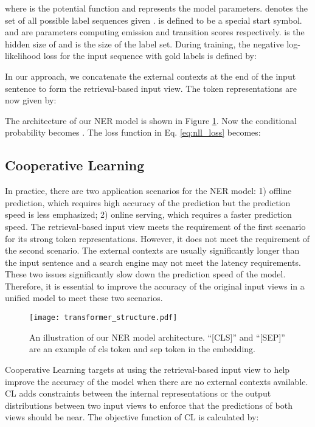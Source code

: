 \documentclass[11pt,a4paper]{article}
\begin{document}
where  is the potential function and  represents the model parameters.  denotes the set of all possible label sequences given .  is defined to be a special start symbol.  and  are parameters computing emission and transition scores respectively.  is the hidden size of  and  is the size of the label set. During training, the negative log-likelihood loss for the input sequence with gold labels  is defined by:


In our approach, we concatenate the external contexts  at the end of the input sentence  to form the retrieval-based input view. The token representations are now given by:

The architecture of our NER model is shown in Figure \ref{fig:ner}. Now the conditional probability  becomes . 
The loss function in Eq. \ref{eq:nll_loss} becomes:





\subsection{Cooperative Learning}
In practice, there are two application scenarios for the NER model: 1) offline prediction, which requires high accuracy of the prediction but the prediction speed is less emphasized; 2) online serving, which requires a faster prediction speed. The retrieval-based input view meets the requirement of the first scenario for its strong token representations. However, it does not meet the requirement of the second scenario. The external contexts are usually significantly longer than the input sentence and a search engine may not meet the latency requirements. These two issues significantly slow down the prediction speed of the model. Therefore, it is essential to improve the accuracy of the original input views in a unified model to meet these two scenarios.



\begin{figure}[t]
	\centering
	\texttt{[image: transformer\_structure.pdf]}
	\caption{An illustration of our NER model architecture. ``[CLS]'' and ``[SEP]'' are an example of cls token and sep token in the embedding. }
	\label{fig:ner}
\end{figure}


Cooperative Learning targets at using the retrieval-based input view to help improve the accuracy of the model when there are no external contexts available. CL adds constraints between the internal representations or the output distributions between two input views to enforce that the predictions of both views should be near. The objective function of CL is calculated by:
\end{document}
